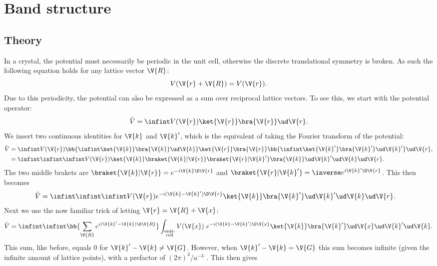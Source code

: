 \documentclass[main.tex]{subfiles}
\begin{document}
	
	\section{Band structure}\label{sec:band_structure}
	\subsection{Theory}
	In a crystal, the potential must necessarily be periodic in the unit cell, otherwise the discrete translational symmetry is broken. As such the following equation holds for any lattice vector $ \V{R} $:
	\begin{equation}\label{eq:band_period_V}
		V(\V{r}+\V{R}) = V(\V{r}).
	\end{equation}
	Due to this periodicity, the potential can also be expressed as a sum over reciprocal lattice vectors. To see this, we start with the potential operator:
	\begin{equation}
		\hat{V} = \infint V(\V{r}) \ket{\V{r}}\bra{\V{r}}\ud \V{r}.
	\end{equation}
	We insert two continuous identities for $ \V{k} $ and $ \V{k}' $, which is the equivalent of taking the Fourier transform of the potential: 
	\begin{align}
		\hat{V} &= \infint V(\V{r}) \bb{\infint \ket{\V{k}} \bra{\V{k}} \ud \V{k}  } \ket{\V{r}}\bra{\V{r}} \bb{\infint \ket{\V{k}'} \bra{\V{k}'} \ud \V{k}' } \ud \V{r} , \\
		&= \infint \infint \infint V(\V{r}) \ket{\V{k}} \braket{\V{k} | \V{r}} \braket{\V{r} | \V{k}'} \bra{\V{k}}  \ud\V{k}'   \ud\V{k}   \ud\V{r}.
	\end{align}
	The two middle brakets are $ \braket{\V{k}| \V{r}}= e^{-i \V{k} \D \V{r}} $ and $ \braket{\V{r} | \V{k}'} = \inverse e^{i \V{k}' \D \V{r}} $. This then becomes
	\begin{align}
		\hat{V} &= \infint \infint  \infint  V(\V{r}) e^{-i(\V{k}-\V{k}') \D \V{r}} \ket{\V{k}} \bra{\V{k}'} \ud\V{k}'   \ud\V{k}   \ud\V{r}.
	\end{align}
	Next we use the now familiar trick of letting $ \V{r} = \V{R} + \V{x} $:
	\begin{equation}
		\hat{V} = \infint \infint  \bb{\sum_{\V{R}} e^{i(\V{k}'-\V{k}) \D \V{R}}}  \int_{\substack{\text{unit-} \\\text{cell}}} V(\V{x})\  e^{-i (\V{k}-\V{k}') \D \V{x}} \ket{\V{k}} \bra{\V{k}'} \ud \V{x} \ud\V{k}'   \ud\V{k}.
	\end{equation}
	This sum, like before, equals 0 for $ \V{k}'-\V{k} \neq \V{G} $. However, when $ \V{k}'-\V{k} = \V{G} $ this sum becomes infinite (given the infinite amount of lattice points), with a prefactor of $ (2\pi)^3 / a^{-3} $ \cite{simon}. This then gives
\end{document}
